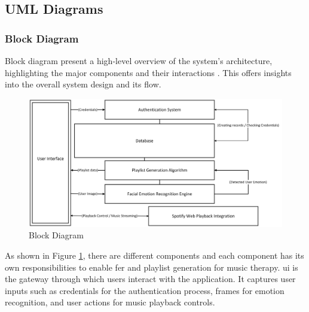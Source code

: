 \subsection{UML Diagrams}
\subsubsection{Block Diagram}
Block diagram present a high-level overview of the system's architecture, highlighting the major components and their interactions \citep{freeman_block}.
This offers insights into the overall system design and its flow.
\begin{figure}[H]
    \centering
    \includegraphics[width=15cm]{Images/block.png}
    \caption{Block Diagram}
    \label{fig:block}
\end{figure}
\indent As shown in Figure \ref{fig:block}, there are different components and each component has its own responsibilities to enable \gls{fer} and playlist generation for music therapy.
\gls{ui} is the gateway through which users interact with the application.
It captures user inputs such as credentials for the authentication process, frames for emotion recognition, and user actions for music playback controls.

\newpage

